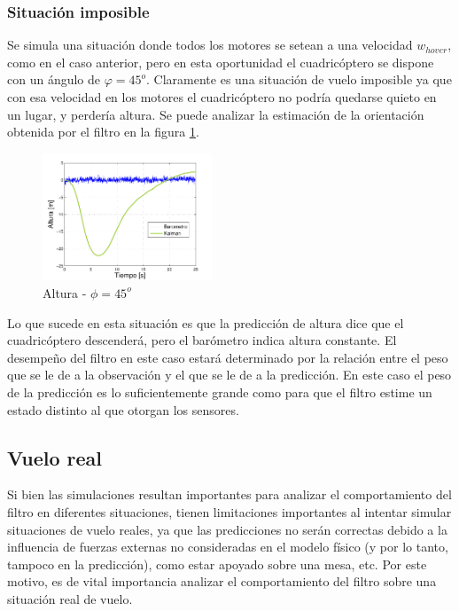 \documentclass[main]{subfiles}
\begin{document}
\subsubsection{Situación imposible}

Se simula una situación donde todos los motores se setean a una velocidad $w_{hover}$, como en el caso anterior, pero en esta oportunidad el cuadricóptero se dispone con un ángulo de $\varphi = 45^o$. Claramente es una situación de vuelo imposible ya que con esa velocidad en los motores el cuadricóptero no podría quedarse quieto en un lugar, y perdería altura. Se puede analizar la estimación de la orientación obtenida por el filtro en la figura \ref{fig:45}.

\begin{figure}
	\begin{center}	
	\vspace{-20pt}
	\includegraphics[width=0.45\textwidth]
		{./pics_kalman/altura_inclinado_45.pdf}
	\end{center}
	\caption{Altura - $\phi = 45^o$}
	\vspace{-20pt}
	\label{fig:45}
\end{figure}

Lo que sucede en esta situación es que la predicción de altura dice que el cuadricóptero descenderá, pero el barómetro indica altura constante. El desempeño del filtro en este caso estará determinado por la relación entre el peso que se le de a la observación y el que se le de a la predicción. En este caso el peso de la predicción es lo suficientemente grande como para que el filtro estime un estado distinto al que otorgan los sensores.

\subsection{Vuelo real}

Si bien las simulaciones resultan importantes para analizar el comportamiento del filtro en diferentes situaciones, tienen limitaciones importantes al intentar simular situaciones de vuelo reales, ya que las predicciones no serán correctas debido a la influencia de fuerzas externas no consideradas en el modelo físico (y por lo tanto, tampoco en la predicción), como estar apoyado sobre una mesa, etc. Por este motivo, es de vital importancia analizar el comportamiento del filtro sobre una situación real de vuelo.\\
\end{document}
